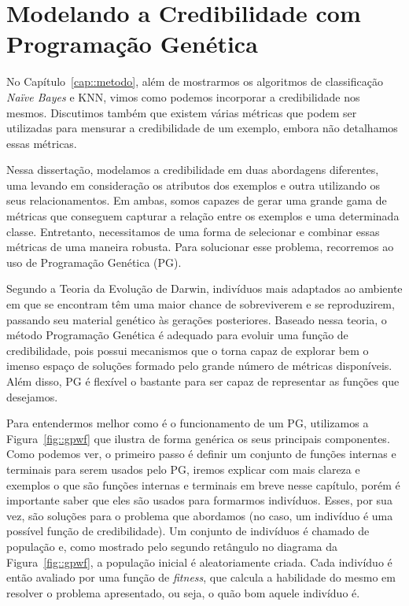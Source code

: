 
\chapter{Modelando a Credibilidade com Programação Genética}
\label{cap::programacao_genetica}

No Capítulo~\ref{cap::metodo},
além de mostrarmos os algoritmos de classificação \textit{Naïve Bayes} e \textsc{KNN}, vimos como podemos incorporar a credibilidade nos mesmos.
Discutimos também que existem várias métricas que podem ser utilizadas para mensurar a credibilidade de um exemplo, 
embora não detalhamos essas métricas.

Nessa dissertação, modelamos a credibilidade em duas abordagens diferentes, uma levando em consideração os atributos dos exemplos e outra utilizando os seus relacionamentos. 
Em ambas, somos capazes de gerar uma grande gama de métricas que conseguem capturar a relação entre os exemplos e uma determinada classe.
Entretanto, necessitamos de uma forma de selecionar e combinar essas métricas de uma maneira robusta. Para solucionar esse problema, recorremos ao uso de Programação Genética (\textsc{PG}).

Segundo a Teoria da Evolução de Darwin, indivíduos mais adaptados ao ambiente em que se encontram têm uma maior chance de sobreviverem e se reproduzirem, passando seu material genético às gerações posteriores. Baseado nessa teoria, o método Programação Genética é adequado para evoluir uma função de credibilidade, pois possui mecanismos que o torna capaz de explorar bem o imenso espaço de soluções formado pelo grande número de métricas disponíveis. Além disso, \textsc{PG} é flexível o bastante para ser capaz de representar as funções que desejamos.

Para entendermos melhor como é o funcionamento de um \textsc{PG}, utilizamos a Figura~\ref{fig::gpwf} que ilustra de forma genérica os seus principais componentes.
Como podemos ver, o primeiro passo é definir um conjunto de funções internas e terminais para serem usados pelo \textsc{PG}, iremos explicar com mais clareza e exemplos o que são funções internas e terminais em breve nesse capítulo, porém é importante saber que eles são usados para formarmos indivíduos. 
Esses, por sua vez, são soluções para o problema que abordamos (no caso, um indivíduo é uma possível função de credibilidade).
Um conjunto de indivíduos é chamado de população e, como mostrado pelo segundo retângulo no diagrama da Figura~\ref{fig::gpwf}, a população inicial é aleatoriamente criada. 
Cada indivíduo é então avaliado por uma função de \textit{fitness}, que calcula a habilidade do mesmo em resolver o problema apresentado, ou seja, o quão bom aquele indivíduo é.

